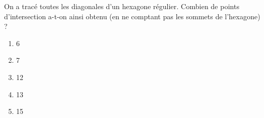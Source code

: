 On a tracé toutes les diagonales d'un hexagone régulier. Combien de points d'intersection a-t-on ainsi obtenu (en ne comptant pas les sommets de l'hexagone) ?
\begin{multicols}{5}
  \begin{enumerate}[A/]
  \item 6
  \item 7
  \item 12
  \item 13
  \item 15
  \end{enumerate}
\end{multicols}